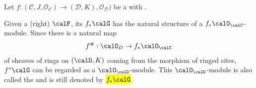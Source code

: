 \begin{definition} \label{definition:direct_image_of_a_module_on_a_ringed_site_via_a_morphism_of_ringed_sites}
    Let $f: (\mathcal{C}, J, \mathcal{O}_{\mathcal{C}}) \to (\mathcal{D}, K), \mathcal{O}_{\mathcal{D}})$ be a  with  .

    Given a (right)  $\calF$, its  $f_* \calG$ has the natural structure of a $f_* \calO_\calC$-module. Since there is a natural map 
    $$f^\#: \calO_D \to f_* \calO_\calC$$
    of sheaves of rings on $(\calD, K)$ coming from the morphism of ringed sites, $f^* \calG$ can be regarded as a $\calO_\calD$-module. This $\calO_\calD$-module is also called the  and is still denoted by \hl{$f_* \calG$}.
\end{definition}